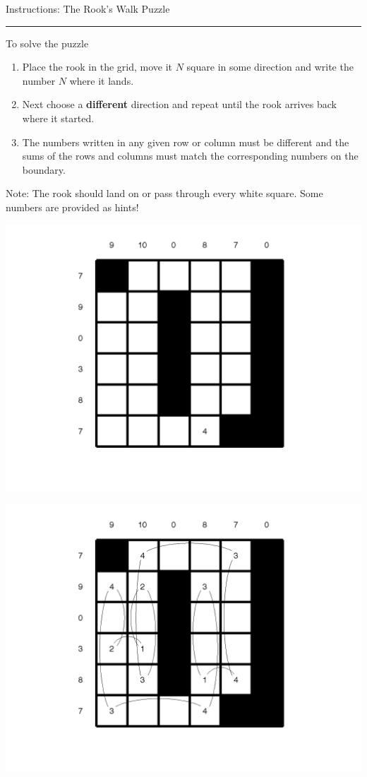 \documentclass[english]{article}
\begin{document}
\begin{center}

{\huge Instructions: The Rook's Walk Puzzle}{\huge \par}

\end{center}\rule[0.5ex]{1\columnwidth}{1pt}

\noindent To solve the puzzle
\begin{enumerate}
\item Place the rook in the grid, move it $N$ square in some direction and write the number $N$ where it lands.
\item 
Next choose a \textbf{different} direction and repeat until the rook arrives back where it started.
\item 
The numbers written in any given row or column must be different and the sums of the rows and columns must match the corresponding numbers on the boundary.
\end{enumerate}
Note: The rook should land on or pass through every white square. Some numbers are provided as hints!
\begin{center}
\includegraphics[scale=0.6]{medium}
\end{center}
\begin{center}
\includegraphics[scale=0.6]{mediumsoln}
\end{center}
\end{document}
